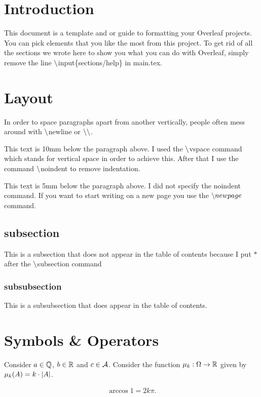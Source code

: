 \pagestyle{fancy}
\fancyhf{}
\lhead{}

\section{Introduction}
This document is a template and or guide to formatting your Overleaf projects. You can pick elements that you like the most from this project. To get rid of all the sections we wrote here to show you what you can do with Overleaf, simply remove the line $\symbol{92}$input\{sections/help\} in main.tex.

\section{Layout}
In order to space paragraphs apart from another vertically, people often mess around with $\symbol{92}$newline or $\symbol{92}\symbol{92}$.

\vspace{10mm}\noindent
This text is 10mm below the paragraph above. I used the $\symbol{92}$vspace command which stands for vertical space in order to achieve this. After that I use the command $\symbol{92}$noindent to remove indentation.

\vspace{5mm}
This text is 5mm below the paragraph above. I did not specify the noindent command. If you want to start writing on a new page you use the $\symbol{92}newpage$ command.

\subsection*{subsection}
This is a subsection that does not appear in the table of contents because I put $*$ after the $\symbol{92}$subsection command
\subsubsection{subsubsection}
This is a subsubsection that does appear in the table of contents.


\section{Symbols \& Operators}
Consider $a\in\mathbb{Q}$, $b\in\mathbb{R}$ and $c\in\mathcal{A}$. Consider the function $\mu_{k}:\Omega\to\mathbb{R}$ given by $\mu_k(A)=k\cdot\left|A\right|$.

\begin{align*}
    \arccos{1} = 2k\pi.
\end{align*}

